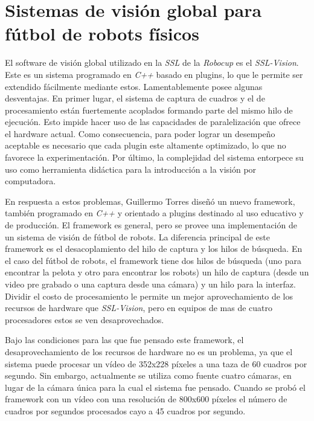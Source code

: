 
\section{Sistemas de visión global para fútbol de robots físicos}


El software de visión global utilizado en la \emph{SSL} de la \emph{Robocup} es
el \emph{SSL-Vision}\cite{sslvision}. Este es un sistema programado en
\emph{C++} basado en plugins, lo que le permite ser extendido fácilmente
mediante estos. Lamentablemente posee algunas desventajas. En primer lugar, el
sistema de captura de cuadros y el de procesamiento están fuertemente
acoplados formando parte del mismo hilo de ejecución. Esto impide hacer uso de
las capacidades de paralelización que ofrece el hardware actual. Como
consecuencia, para poder lograr un desempeño aceptable es necesario que cada
plugin este altamente optimizado, lo que no favorece la experimentación. Por
último, la complejidad del sistema entorpece su uso como herramienta didáctica
para la introducción a la visión por computadora.

En respuesta a estos problemas, Guillermo Torres\cite{torres2012, torres2014}
diseñó un nuevo framework, también programado en \emph{C++} y orientado a
plugins destinado al uso educativo y de producción. El framework es general,
pero se provee una implementación de un sistema de visión de fútbol de robots.
La diferencia principal de este framework es el desacoplamiento del hilo de
captura y los hilos de búsqueda. En el caso del fútbol de robots, el framework
tiene dos hilos de búsqueda (uno para encontrar la pelota y otro para encontrar
los robots) un hilo de captura (desde un video pre grabado o una captura desde
una cámara) y un hilo para la interfaz. Dividir el costo de procesamiento le
permite un mejor aprovechamiento de los recursos de hardware que
\emph{SSL-Vision}, pero en equipos de mas de cuatro procesadores estos se ven
desaprovechados.

Bajo las condiciones para las que fue pensado este framework, el
desaprovechamiento de los recursos de hardware no es un problema, ya que el
sistema puede procesar un vídeo de 352x228 píxeles a una taza de 60 cuadros por
segundo. Sin embargo, actualmente se utiliza como fuente cuatro cámaras, en
lugar de la cámara única para la cual el sistema fue pensado. Cuando se probó el
framework con un vídeo con una resolución de 800x600 píxeles el número de
cuadros por segundos procesados cayo a 45 cuadros por segundo.
